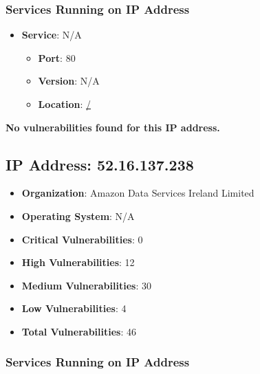 \documentclass{article}
\begin{document}
\subsubsection*{Services Running on IP Address}

\begin{itemize}
    
        \item \textbf{Service}: N/A
        \begin{itemize}
            \item \textbf{Port}: 80
            \item \textbf{Version}:  N/A 
            \item \textbf{Location}: \href{ / }{ / }
        \end{itemize}
    
\end{itemize}


\textbf{No vulnerabilities found for this IP address.}




\clearpage



\subsection*{IP Address: 52.16.137.238}

\begin{itemize}
    \item \textbf{Organization}: Amazon Data Services Ireland Limited
    \item \textbf{Operating System}:  N/A 
    \item \textbf{Critical Vulnerabilities}: 0
    \item \textbf{High Vulnerabilities}: 12
    \item \textbf{Medium Vulnerabilities}: 30
    \item \textbf{Low Vulnerabilities}: 4
    \item \textbf{Total Vulnerabilities}: 46
\end{itemize}

\subsubsection*{Services Running on IP Address}
\end{document}
